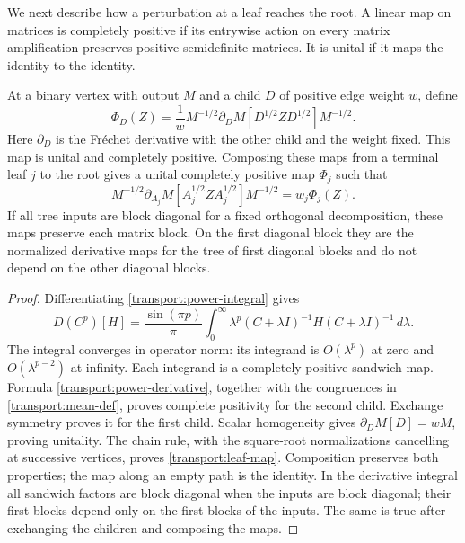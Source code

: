 We next describe how a perturbation at a leaf reaches the root.  A linear
map on matrices is completely positive if its entrywise action on every
matrix amplification preserves positive semidefinite matrices.  It is
unital if it maps the identity to the identity.

\begin{lemma}\label{transport:cp}
At a binary vertex with output $M$ and a child $D$ of positive edge
weight $w$, define
\begin{equation}\label{transport:edge-map}
 \Phi_D(Z)=\frac1w M^{-1/2}
   \partial_D M[D^{1/2}ZD^{1/2}]M^{-1/2}.
\end{equation}
Here $\partial_D$ is the Fr\'echet derivative with the other child and the
weight fixed.  This map is unital and completely positive.  Composing
these maps from a terminal leaf $j$ to the root gives a unital completely
positive map $\Phi_j$ such that
\begin{equation}\label{transport:leaf-map}
 M^{-1/2}\partial_{A_j}M[A_j^{1/2}ZA_j^{1/2}]M^{-1/2}
 =w_j\Phi_j(Z).
\end{equation}
If all tree inputs are block diagonal for a fixed orthogonal
decomposition, these maps preserve each matrix block.  On the first
diagonal block they are the normalized derivative maps for the tree of
first diagonal blocks and do not depend on the other diagonal blocks.
\end{lemma}

\begin{proof}
Differentiating \eqref{transport:power-integral} gives
\begin{equation}\label{transport:power-derivative}
 D(C^p)[H]=\frac{\sin(\pi p)}{\pi}
 \int_0^\infty\lambda^p(C+\lambda I)^{-1}H(C+\lambda I)^{-1}\,d\lambda.
\end{equation}
The integral converges in operator norm: its integrand is $O(\lambda^p)$
at zero and $O(\lambda^{p-2})$ at infinity.  Each integrand is a
completely positive sandwich map.  Formula
\eqref{transport:power-derivative}, together with the congruences in
\eqref{transport:mean-def}, proves complete positivity for the second
child.  Exchange symmetry proves it for the first child.  Scalar
homogeneity gives $\partial_D M[D]=wM$, proving unitality.
The chain rule, with the square-root normalizations cancelling at
successive vertices, proves \eqref{transport:leaf-map}.  Composition
preserves both properties; the map along an empty path is the identity.
In the derivative integral all sandwich
factors are block diagonal when the inputs are block diagonal; their
first blocks depend only on the first blocks of the inputs.  The same
is true after exchanging the children and composing the maps.
\end{proof}

